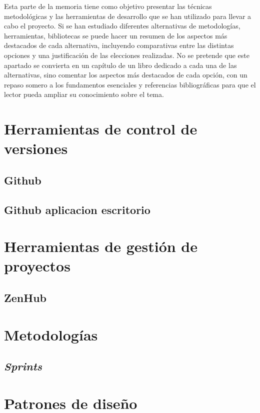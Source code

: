 
Esta parte de la memoria tiene como objetivo presentar las técnicas metodológicas y las herramientas de desarrollo que se han utilizado para llevar a cabo el proyecto. Si se han estudiado diferentes alternativas de metodologías, herramientas, bibliotecas se puede hacer un resumen de los aspectos más destacados de cada alternativa, incluyendo comparativas entre las distintas opciones y una justificación de las elecciones realizadas. 
No se pretende que este apartado se convierta en un capítulo de un libro dedicado a cada una de las alternativas, sino comentar los aspectos más destacados de cada opción, con un repaso somero a los fundamentos esenciales y referencias bibliográficas para que el lector pueda ampliar su conocimiento sobre el tema.


\section{Herramientas de control de versiones}

\subsection{Github}

\subsection{Github aplicacion escritorio}

\section{Herramientas de gestión de proyectos}

\subsection{ZenHub}

\section{Metodologías}

\subsection{\textit{Sprints}}

\section{Patrones de diseño}

